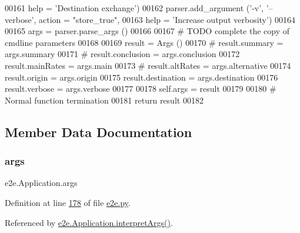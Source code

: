\begin{DoxyCode}
00161                              help = \textcolor{stringliteral}{'Destination exchange'})
00162         parser.add\_argument (\textcolor{stringliteral}{'-v'}, \textcolor{stringliteral}{'--verbose'}, action = \textcolor{stringliteral}{"store\_true"},
00163                              help = \textcolor{stringliteral}{'Increase output verbosity'})
00164                              
00165         args = parser.parse\_args ()
00166         
00167         \textcolor{comment}{# TODO complete the copy of cmdline parameters}
00168         
00169         result = Args ()
00170 \textcolor{comment}{#        result.summary     = args.summary }
00171 \textcolor{comment}{#        result.conclusion  = args.conclusion }
00172         result.mainRates   = args.main 
00173 \textcolor{comment}{#        result.altRates    = args.alternative }
00174         result.origin      = args.origin 
00175         result.destination = args.destination 
00176         result.verbose     = args.verbose
00177         
00178         self.args = result
00179         
00180         \textcolor{comment}{# Normal function termination}
00181         \textcolor{keywordflow}{return} result
00182         
\end{DoxyCode}


\subsection{Member Data Documentation}
\mbox{\label{classe2e_1_1_application_abade6fc2e2c04ddd7e48137a2a7721bd}} 
\subsubsection{\texorpdfstring{args}{args}}
{\footnotesize\ttfamily e2e.\+Application.\+args}



Definition at line \hyperlink{e2e_8py_source_l00178}{178} of file \hyperlink{e2e_8py_source}{e2e.\+py}.



Referenced by \hyperlink{e2e_8py_source_l00183}{e2e.\+Application.\+interpret\+Args()}.

\mbox{\label{classe2e_1_1_application_a57206c6ccc86c2659edfd8d73d2029f3}} 
